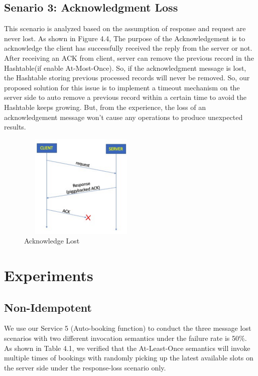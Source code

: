 \begin{spacing}{1}
\subsection{Senario 3: Acknowledgment Loss}
This scenario is analyzed based on the assumption of response and request are never lost. As shown in Figure 4.4, 
The purpose of the Acknowledgement is to acknowledge the client has successfully received the reply from the server or not. After receiving an ACK from client, server can remove the previous record in the Hashtable(if enable At-Most-Once). So, if the acknowledgment message is lost, the Hashtable storing previous processed records will never be removed. So, our proposed solution for this issue is to implement a timeout mechanism on the server side to auto remove a previous record within a certain time to avoid the Hashtable keeps growing. But, from the experience, the loss of an acknowledgement message won’t cause any operations to produce unexpected results.

\begin{figure}[h!]
\centering
  \includegraphics[width=6cm, height=5cm]{Image/3.png}
  \caption{Acknowledge Lost}
\end{figure}



\section{Experiments}

\subsection{Non-Idempotent}
We use our Service 5 (Auto-booking function) to conduct the three message lost scenarios with two different invocation semantics under the failure rate is 50\%. As shown in Table 4.1, we verified that the At-Least-Once semantics will invoke multiple times of bookings with randomly picking up the latest available slots on the server side under the response-loss scenario only.


\end{spacing}
